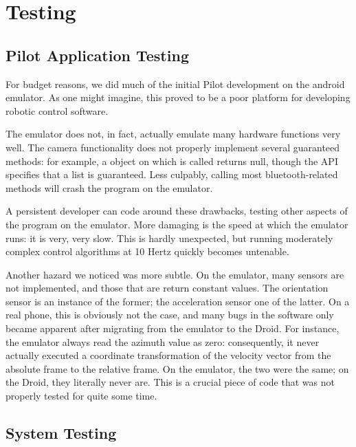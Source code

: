 \section{Testing}
\subsection{Pilot Application Testing}
For budget reasons, we did much of the initial Pilot development on
the android emulator.  As one might imagine, this proved to be a poor
platform for developing robotic control software.

The emulator does not, in fact, actually emulate many hardware
functions very well.  The camera functionality does not properly
implement several guaranteed methods: for example, a
 object on which
 is called returns null, though the
API specifies that a list is guaranteed.  Less culpably, calling most
bluetooth-related methods will crash the program on the emulator.

A persistent developer can code around these drawbacks, testing other
aspects of the program on the emulator.  More damaging is the speed at
which the emulator runs: it is very, very slow.  This is hardly
unexpected, but running moderately complex control algorithms at 10
Hertz quickly becomes untenable.

Another hazard we noticed was more subtle.  On the emulator, many
sensors are not implemented, and those that are return constant
values.  The orientation sensor is an instance of the former; the
acceleration sensor one of the latter.  On a real phone, this is
obviously not the case, and many bugs in the software only became
apparent after migrating from the emulator to the Droid.  For
instance, the emulator always read the azimuth value as zero:
consequently, it never actually executed a coordinate transformation
of the velocity vector from the absolute frame to the relative frame.
On the emulator, the two were the same; on the Droid, they literally
never are.  This is a crucial piece of code that was not properly
tested for quite some time.

\subsection{System Testing}
